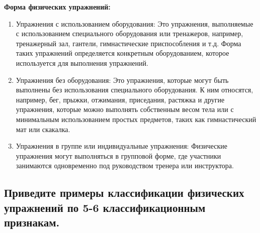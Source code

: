 \textbf{Форма физических упражнений:}
\begin{enumerate}
    \item Упражнения с использованием оборудования: Это упражнения, выполняемые с использованием специального оборудования или тренажеров, например, тренажерный зал, гантели, гимнастические приспособления и т.д. Форма таких упражнений определяется конкретным оборудованием, которое используется для выполнения упражнений.
    \item Упражнения без оборудования: Это упражнения, которые могут быть выполнены без использования специального оборудования. К ним относятся, например, бег, прыжки, отжимания, приседания, растяжка и другие упражнения, которые можно выполнять собственным весом тела или с минимальным использованием простых предметов, таких как гимнастический мат или скакалка.
    \item Упражнения в группе или индивидуальные упражнения: Физические упражнения могут выполняться в групповой форме, где участники занимаются одновременно под руководством тренера или инструктора.
\end{enumerate}

\subsection{Приведите примеры классификации физических упражнений по 5-6 классификационным признакам.}

